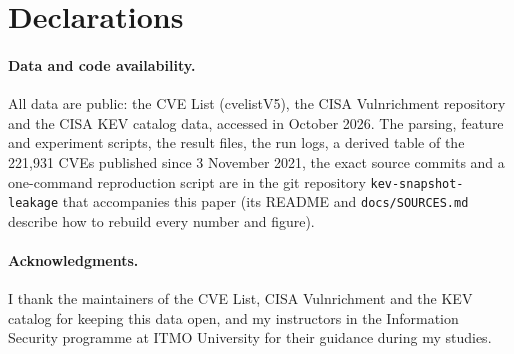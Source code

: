 \documentclass[11pt,a4paper]{article}
\newif\ifanon
\begin{document}
\section*{Declarations}

\paragraph{Data and code availability.} All data are public: the CVE List (cvelistV5), the CISA Vulnrichment repository and the CISA KEV catalog data, accessed in October 2026. The parsing, feature and experiment scripts, the result files, the run logs, a derived table of the 221,931 CVEs published since 3 November 2021, the exact source commits and a one-command reproduction script are in the git repository \texttt{kev-snapshot-leakage} that accompanies this paper (its README and \texttt{docs/SOURCES.md} describe how to rebuild every number and figure).

\ifanon
\else
\paragraph{Acknowledgments.} I thank the maintainers of the CVE List, CISA Vulnrichment and the KEV catalog for keeping this data open, and my instructors in the Information Security programme at ITMO University for their guidance during my studies.
\fi
\end{document}
